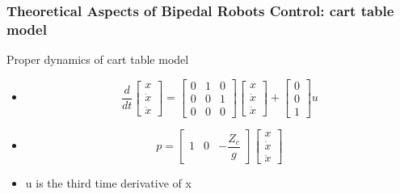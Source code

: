 \documentclass{beamer}
\begin{document}
	\begin{frame}
		\frametitle{Theoretical Aspects of Bipedal Robots Control: cart table model}
		\begin{block}{Proper dynamics of cart table model}
			\begin{itemize}
				\item
					\begin{equation}
						\dfrac{d}{dt} \begin{bmatrix} x \\ \dot{x} \\ \ddot{x} \end{bmatrix} = \begin{bmatrix} 0 & 1 & 0 \\ 0 & 0 & 1 \\ 0 & 0& 0 \end{bmatrix}  \begin{bmatrix} x \\ \dot{x} \\ \ddot{x} \end{bmatrix} + \begin{bmatrix} 0 \\0 \\ 1 \end{bmatrix} u
					\end{equation}
				\item
					\begin{equation}
						p = \begin{bmatrix} 1 & 0  & - \dfrac{Z_c}{g} \end{bmatrix}\begin{bmatrix} x \\ \dot{x} \\ \ddot{x} \end{bmatrix}
					\end{equation}
				\item
					u is the third time derivative of x
			\end{itemize}
		\end{block}
	\end{frame}
	
\end{document}
